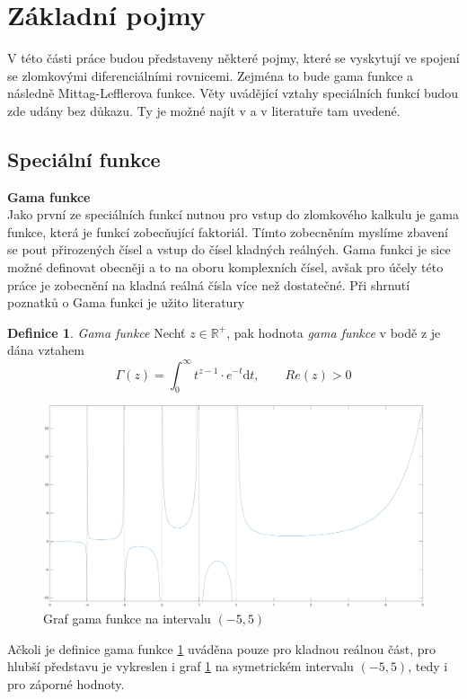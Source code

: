 \documentclass[a4paper,12pt,twoside]{article}
\theoremstyle{definition}
\newtheorem{defin}[veta]{Definice}
\theoremstyle{remark}
\numberwithin{equation}{section}
\numberwithin{table}{section}
\numberwithin{figure}{section}
\newcommand{\dx}[1]{\mathrm{d} #1}
\newcommand{\R}{\mathbb{R}}
\begin{document}
\section{Základní pojmy}
V této části práce budou představeny některé pojmy, které se vyskytují ve spojení se zlomkovými diferenciálními rovnicemi. Zejména to bude gama funkce a následně Mittag-Lefflerova funkce. Věty uvádějící vztahy speciálních funkcí budou zde udány bez důkazu. Ty je možné najít v \cite{Podlubny} a v literatuře tam uvedené.
\subsection{Speciální funkce}
\textbf{Gama funkce} \\
Jako první ze speciálních funkcí nutnou pro vstup do zlomkového kalkulu je gama funkce, která je funkcí zobecňující faktoriál. Tímto zobecněním myslíme zbavení se pout přirozených čísel a vstup do čísel kladných reálných. Gama funkci je sice možné definovat obecněji a to na oboru komplexních čísel, avšak pro účely této práce je zobecnění na kladná reálná čísla více než dostatečné.
Při shrnutí poznatků o Gama funkci je užito literatury \cite{Bashour}
 
\begin{defin}{\emph{Gama funkce}} \label{GammaFunkce}
	Nechť $z \in \R ^{+}$, pak hodnota \emph{gama funkce} v bodě z je dána vztahem
	$$
	\Gamma \left( z\right)  = \int_{0}^{ \infty } t^{z-1} \cdot e^{-t} \dx{t}, \qquad  Re\left( z\right)  > 0
	$$
\end{defin}


\begin{figure} [h!] 
	\caption{Graf gama funkce na  intervalu $\left(-5,5\right)$}
	\label{GrafGamma}
	\includegraphics[width=1\textwidth]{GammaFunction(-5,5).png}
\end{figure}
Ačkoli je definice gama funkce \ref{GammaFunkce} uváděna pouze pro  kladnou reálnou část, pro hlubší představu je vykreslen i graf \ref{GrafGamma} na symetrickém intervalu $\left(-5, 5\right)$, tedy i pro záporné hodnoty. 
\end{document}
